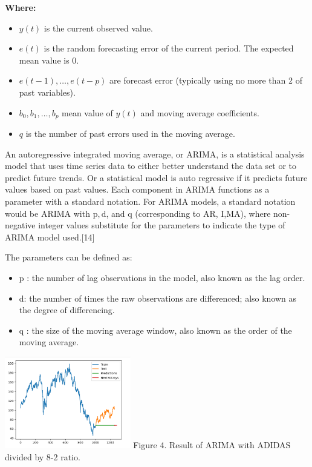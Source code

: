 \documentclass[conference]{IEEEtran}
\begin{document}
{\begin{itemize}
  \begin{flushleft}
    \textbf{Where:}
    \begin{itemize}
      \item $y(t)$ is the current observed value.
      \item $e(t)$ is the random forecasting error of the current period. The expected mean value is 0.
      \item $e(t - 1), \dots , e(t - p)$ are forecast error (typically using no more than 2 of past variables).
      \item $b_0, b_1, \dots , b_p$ mean value of $y(t)$ and moving average coefficients.
      \item $q$ is the number of past errors used in the moving average.
    \end{itemize}
  \end{flushleft}
\end{itemize}
An autoregressive integrated moving average, or ARIMA, is a statistical analysis model that uses time series data to either better understand the data set or to predict future trends. Or a statistical model is auto regressive if it predicts future values based on past values.
Each component in ARIMA functions as a parameter with a standard notation.
For ARIMA models, a standard notation would be ARIMA with $\mathrm{p}, \mathrm{d}$, and $\mathrm{q}$ (corresponding to AR, I,MA), where non-negative integer values substitute for the parameters to indicate the type of ARIMA model used.[14]

The parameters can be defined as:

\begin{itemize}
  \item $\mathrm{p}$ : the number of lag observations in the model, also known as the lag order.
  \item d: the number of times the raw observations are differenced; also known as the degree of differencing.
  \item $\mathrm{q}$ : the size of the moving average window, also known as the order of the moving average.
\end{itemize}


\begin{center}
\includegraphics[max width=\linewidth, height = 4cm, center]{ARIMA_ADDYY_8-2.png}
Figure 4. Result of ARIMA with ADIDAS divided by 8-2 ratio.
\end{center}

}
\end{document}
